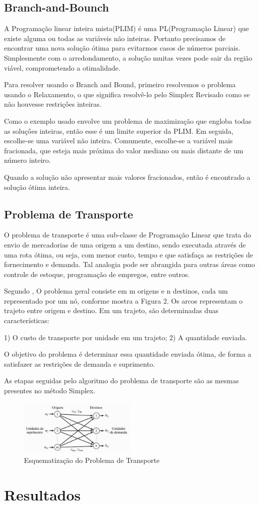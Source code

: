 \documentclass [11pt]{articleSBPO}
\begin{document}
\subsection{Branch-and-Bounch}

A Programação linear inteira mista(PLIM) é uma PL(Programação Linear) que existe alguma ou todas as variáveis não inteiras. Portanto precisamos de encontrar uma nova solução ótima para evitarmos casos de números parciais. Simplesmente com o arredondamento, a solução muitas vezes pode sair da região viável, comprometendo a otimalidade. 

Para resolver usando o Branch and Bound, primeiro resolvemos o problema usando o Relaxamento, o que significa resolvê-lo pelo Simplex Revisado como se não houvesse restriçőes inteiras.

Como o exemplo usado envolve um problema de maximização que engloba todas as soluçőes inteiras, então esse é um limite superior da PLIM. Em seguida, escolhe-se uma variável não inteira. Comumente, escolhe-se a variável mais fracionada, que esteja mais próxima do valor mediano ou mais distante de um número inteiro.

Quando a solução não apresentar mais valores fracionados, então é encontrado a solução ótima inteira. 

\subsection{Problema de Transporte}

O problema de transporte é uma sub-classe de Programação Linear que trata do envio de mercadorias de uma origem a um destino, sendo executada através de uma rota ótima, ou seja, com menor custo, tempo e que satisfaça as restrições de fornecimento e demanda. Tal analogia pode ser abrangida para outras áreas como controle de estoque, programação de empregos, entre outros.

Segundo \cite{TAHA}, O problema geral consiste em m origens e n destinos, cada um representado por um nó, conforme mostra a Figura 2. Os arcos representam o trajeto entre origem e destino. Em um trajeto, são determinadas duas características:

    1) O custo de transporte por unidade em um trajeto;
    2) A quantidade enviada.

O objetivo do problema é determinar essa quantidade enviada ótima, de forma a satisfazer as restrições de demanda e suprimento.

As etapas seguidas pelo algoritmo do problema de transporte são as mesmas presentes no método Simplex.

\begin{figure}[!h]
\centering
\includegraphics[width=0.5\textwidth]{img/img2.png}
\caption[]{Esquematização do Problema de Transporte}
\label{fig:figura2}
\end{figure}

\section{Resultados}
\label{sec:resultados}



\end{document}
